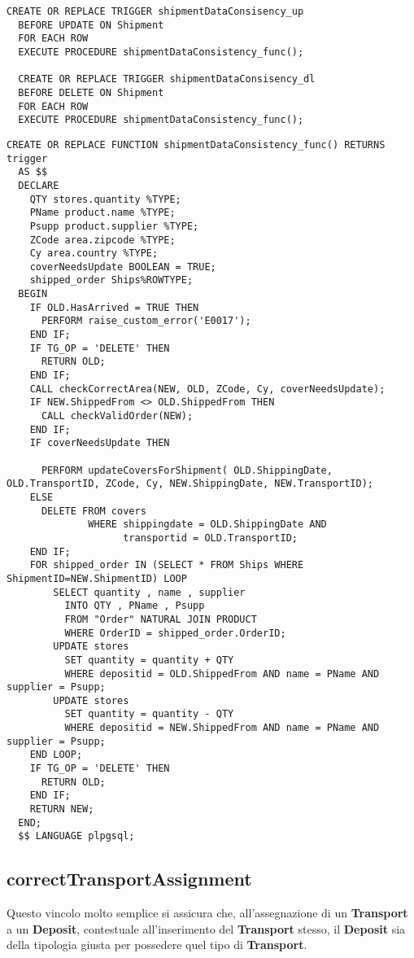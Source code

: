 \begin{lstlisting}[caption={Trigger per \textbf{UPDATE/DELETE ON Shipment}}]
  CREATE OR REPLACE TRIGGER shipmentDataConsisency_up
  BEFORE UPDATE ON Shipment
  FOR EACH ROW
  EXECUTE PROCEDURE shipmentDataConsistency_func();

  CREATE OR REPLACE TRIGGER shipmentDataConsisency_dl
  BEFORE DELETE ON Shipment
  FOR EACH ROW
  EXECUTE PROCEDURE shipmentDataConsistency_func();
\end{lstlisting}
\newpage
\begin{lstlisting}[caption={Funzione completa}]
  CREATE OR REPLACE FUNCTION shipmentDataConsistency_func() RETURNS trigger
  AS $$
  DECLARE
    QTY stores.quantity %TYPE;
    PName product.name %TYPE;
    Psupp product.supplier %TYPE;
    ZCode area.zipcode %TYPE;
    Cy area.country %TYPE;
    coverNeedsUpdate BOOLEAN = TRUE;
    shipped_order Ships%ROWTYPE;
  BEGIN
    IF OLD.HasArrived = TRUE THEN
      PERFORM raise_custom_error('E0017');
    END IF;
    IF TG_OP = 'DELETE' THEN
      RETURN OLD;
    END IF;
    CALL checkCorrectArea(NEW, OLD, ZCode, Cy, coverNeedsUpdate);
    IF NEW.ShippedFrom <> OLD.ShippedFrom THEN
      CALL checkValidOrder(NEW);
    END IF;
    IF coverNeedsUpdate THEN

      PERFORM updateCoversForShipment( OLD.ShippingDate, OLD.TransportID, ZCode, Cy, NEW.ShippingDate, NEW.TransportID);
    ELSE 
      DELETE FROM covers 
              WHERE shippingdate = OLD.ShippingDate AND 
                    transportid = OLD.TransportID;
    END IF;
    FOR shipped_order IN (SELECT * FROM Ships WHERE ShipmentID=NEW.ShipmentID) LOOP
        SELECT quantity , name , supplier 
          INTO QTY , PName , Psupp
          FROM "Order" NATURAL JOIN PRODUCT
          WHERE OrderID = shipped_order.OrderID;
        UPDATE stores
          SET quantity = quantity + QTY
          WHERE depositid = OLD.ShippedFrom AND name = PName AND supplier = Psupp;
        UPDATE stores
          SET quantity = quantity - QTY
          WHERE depositid = NEW.ShippedFrom AND name = PName AND supplier = Psupp;
    END LOOP;
    IF TG_OP = 'DELETE' THEN
      RETURN OLD;
    END IF;
    RETURN NEW;
  END;
  $$ LANGUAGE plpgsql;
\end{lstlisting}

\subsection{\textbf{correctTransportAssignment}}

Questo vincolo molto semplice si assicura che, all'assegnazione di un \textbf{Transport} a un \textbf{Deposit}, contestuale all'inserimento del \textbf{Transport} stesso, il \textbf{Deposit} sia della tipologia giusta per possedere quel tipo di \textbf{Transport}.

